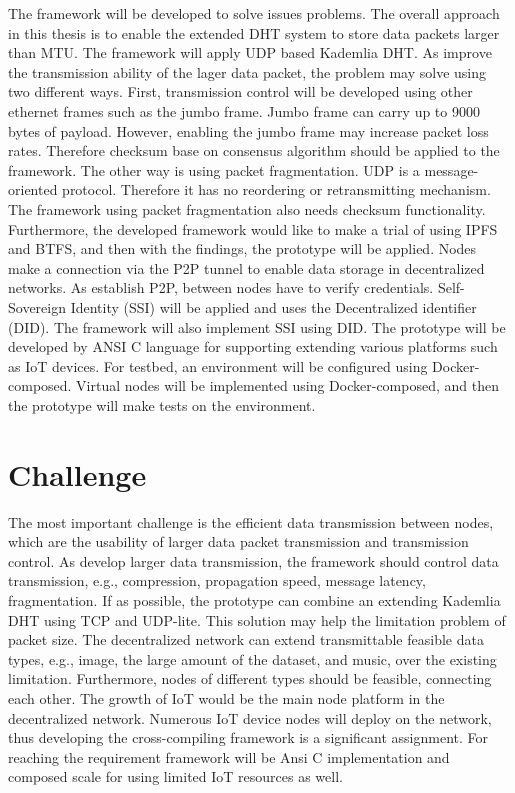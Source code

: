 \documentclass{article}
\begin{document}
The framework will be developed to solve issues problems. The overall approach in this thesis is to enable the extended DHT system to store data packets larger than MTU. The framework will apply UDP based Kademlia DHT. As improve the transmission ability of the lager data packet, the problem may solve using two different ways. First, transmission control will be developed using other ethernet frames such as the jumbo frame\cite{alliance2009ethernet}. Jumbo frame can carry up to 9000 bytes of payload. However, enabling the jumbo frame may increase packet loss rates. Therefore checksum base on consensus algorithm should be applied to the framework.
The other way is using packet fragmentation. UDP is a message-oriented protocol. Therefore it has no reordering or retransmitting mechanism. The framework using packet fragmentation also needs checksum functionality. Furthermore, the developed framework would like to make a trial of using IPFS and BTFS, and then with the findings, the prototype will be applied. Nodes make a connection via the P2P tunnel to enable data storage in decentralized networks. As establish P2P, between nodes have to verify credentials. Self-Sovereign Identity (SSI)\cite{tobin2016inevitable} will be applied and uses the Decentralized identifier (DID)\cite{sabadello2018introduction}. The framework will also implement SSI using DID. The prototype will be developed by ANSI C language for supporting extending various platforms such as IoT devices. For testbed, an environment will be configured using Docker-composed. Virtual nodes will be implemented using Docker-composed, and then the prototype will make tests on the environment.


\section{Challenge}
The most important challenge is the efficient data transmission between nodes, which are the usability of larger data packet transmission and transmission control. As develop larger data transmission, the framework should control data transmission, e.g., compression, propagation speed, message latency, fragmentation. If as possible, the prototype can combine an extending Kademlia DHT using TCP and UDP-lite\cite{rfc3828}. This solution may help the limitation problem of packet size. The decentralized network can extend transmittable feasible data types, e.g., image, the large amount of the dataset, and music, over the existing limitation. Furthermore, nodes of different types should be feasible, connecting each other. The growth of IoT would be the main node platform in the decentralized network. Numerous IoT device nodes will deploy on the network, thus developing the cross-compiling framework is a significant assignment. For reaching the requirement framework will be Ansi C implementation and composed scale for using limited IoT resources as well.
\end{document}
